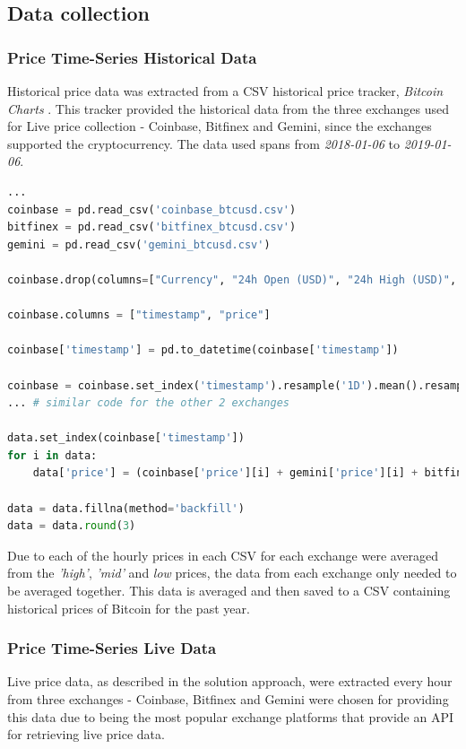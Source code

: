 \documentclass[oneside, 12pt]{article}
\begin{document}
		\subsection{Data collection}\label{collection}
			\subsubsection{Price Time-Series Historical Data}
			Historical price data was extracted from a CSV historical price tracker, \textit{Bitcoin Charts} \cite{btcCharts}. This tracker provided the historical data from the three exchanges used for Live price collection - Coinbase, Bitfinex and Gemini, since the exchanges supported the cryptocurrency. The data used spans from \textit{2018-01-06} to \textit{2019-01-06}.
			
			\begin{lstlisting}[language=Python, caption=Historical price collection and averaging per exchange]
...
coinbase = pd.read_csv('coinbase_btcusd.csv')
bitfinex = pd.read_csv('bitfinex_btcusd.csv')
gemini = pd.read_csv('gemini_btcusd.csv')
			
coinbase.drop(columns=["Currency", "24h Open (USD)", "24h High (USD)", "24h Low (USD)"], axis=1, inplace=True)
			
coinbase.columns = ["timestamp", "price"]
			
coinbase['timestamp'] = pd.to_datetime(coinbase['timestamp'])
			
coinbase = coinbase.set_index('timestamp').resample('1D').mean().resample('1H').mean()
... # similar code for the other 2 exchanges
			
data.set_index(coinbase['timestamp'])
for i in data:
	data['price'] = (coinbase['price'][i] + gemini['price'][i] + bitfinex['price'][i])/3
			
data = data.fillna(method='backfill')
data = data.round(3)
			\end{lstlisting}
			
			Due to each of the hourly prices in each CSV for each exchange were averaged from the \textit{'high'}, \textit{'mid'} and \textit{low} prices, the data from each exchange only needed to be averaged together. This data is averaged and then saved to a CSV containing historical prices of Bitcoin for the past year.
			
			\subsubsection{Price Time-Series Live Data}
			Live price data, as described in the solution approach, were extracted every hour from three exchanges - Coinbase, Bitfinex and Gemini were chosen for providing this data due to being the most popular exchange platforms that provide an API for retrieving live price data.
								
\end{document}

